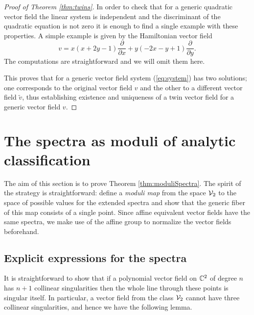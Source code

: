 \documentclass[phd,tocprelim]{cornell}
\begin{document}
\begin{proof}[Proof of Theorem \ref*{thm:twins}]
In order to check that for a generic quadratic vector field the linear system is independent and the discriminant of the quadratic equation is not zero it is enough to find a single example with these properties. A simple example is given by the Hamiltonian vector field 
\begin{equation}\label{eq:Hamiltonianvf}
v=x(x+2y-1)\frac{\partial}{\partial x}+y(-2x-y+1)\frac{\partial}{\partial y}.
\end{equation}
 The computations are straightforward and we will omit them here.

This proves that for a generic vector field system (\ref{eq:system}) has two solutions; one corresponds to the original vector field $v$ and the other to a different vector field $\tilde{v}$, thus establishing existence and uniqueness of a twin vector field for a generic vector field $v$.
\end{proof}




\section{The spectra as moduli of analytic classification}

The aim of this section is to prove Theorem \ref{thm:moduliSpectra}. The spirit of the strategy is straightforward: define a \textit{moduli map} from the space $\mathcal{V}_2$ to the space of possible values for the extended spectra and show that the generic fiber of this map consists of a single point. Since affine equivalent vector fields have the same spectra, we make use of the affine group to normalize the vector fields beforehand.


\subsection{Explicit expressions for the spectra}

\begin{remark}
It is straightforward to show that if a polynomial vector field on $\mathbb{C}^2$ of degree $n$ has $n+1$ collinear singularities then the whole line through these points is singular itself. In particular, a vector field from the class $\mathcal{V}_2$ cannot have three collinear singularities, and hence we have the following lemma.
\end{remark}
\end{document}
